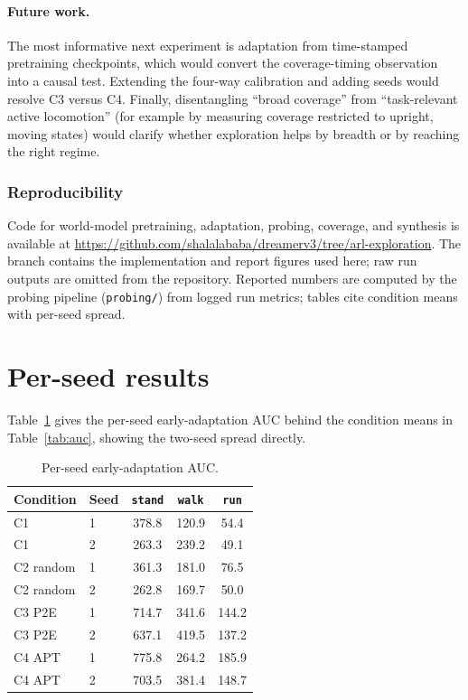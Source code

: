 \documentclass{article}
\begin{document}
\paragraph{Future work.}
The most informative next experiment is adaptation from time-stamped pretraining
checkpoints, which would convert the coverage-timing observation into a causal
test. Extending the four-way calibration and adding seeds would resolve C3
versus C4. Finally, disentangling ``broad coverage'' from ``task-relevant active
locomotion'' (for example by measuring coverage restricted to upright, moving
states) would clarify whether exploration helps by breadth or by reaching the
right regime.

\subsubsection*{Reproducibility}
Code for world-model pretraining, adaptation, probing, coverage, and synthesis
is available at
\url{https://github.com/shalalababa/dreamerv3/tree/arl-exploration}. The branch
contains the implementation and report figures used here; raw run outputs are
omitted from the repository. Reported numbers are computed by the probing pipeline
(\texttt{probing/}) from logged run metrics; tables cite condition means with
per-seed spread.




\appendix
\section{Per-seed results}
Table~\ref{tab:perseed} gives the per-seed early-adaptation AUC behind the
condition means in Table~\ref{tab:auc}, showing the two-seed spread directly.

\begin{table}[h]
\centering
\caption{Per-seed early-adaptation AUC.}
\label{tab:perseed}
\begin{tabular}{llccc}
\toprule
Condition & Seed & \texttt{stand} & \texttt{walk} & \texttt{run} \\
\midrule
C1 & 1 & 378.8 & 120.9 & 54.4 \\
C1 & 2 & 263.3 & 239.2 & 49.1 \\
C2 random & 1 & 361.3 & 181.0 & 76.5 \\
C2 random & 2 & 262.8 & 169.7 & 50.0 \\
C3 P2E & 1 & 714.7 & 341.6 & 144.2 \\
C3 P2E & 2 & 637.1 & 419.5 & 137.2 \\
C4 APT & 1 & 775.8 & 264.2 & 185.9 \\
C4 APT & 2 & 703.5 & 381.4 & 148.7 \\
\bottomrule
\end{tabular}
\end{table}
\end{document}
